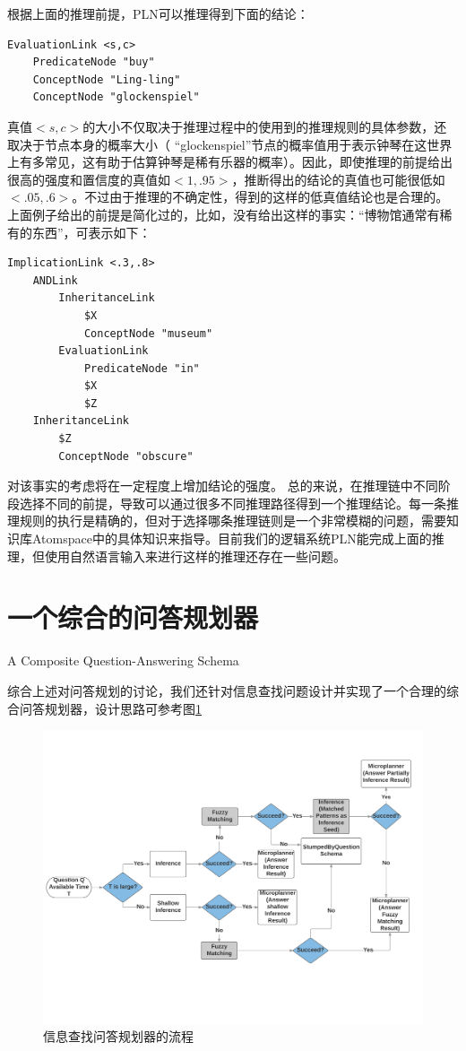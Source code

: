根据上面的推理前提，PLN可以推理得到下面的结论：

\begin{verbatim}
EvaluationLink <s,c>
	PredicateNode "buy"
	ConceptNode "Ling-ling"
	ConceptNode "glockenspiel"
\end{verbatim}

真值$<s,c>$的大小不仅取决于推理过程中的使用到的推理规则的具体参数，还取决于节点本身的概率大小（ “glockenspiel”节点的概率值用于表示钟琴在这世界上有多常见，这有助于估算钟琴是稀有乐器的概率）。因此，即使推理的前提给出很高的强度和置信度的真值如$<1,.95>$，推断得出的结论的真值也可能很低如$<.05,.6>$。不过由于推理的不确定性，得到的这样的低真值结论也是合理的。
上面例子给出的前提是简化过的，比如，没有给出这样的事实：“博物馆通常有稀有的东西”，可表示如下：

\begin{verbatim}
ImplicationLink <.3,.8>
	ANDLink
		InheritanceLink
			$X
			ConceptNode "museum"
		EvaluationLink
			PredicateNode "in"
			$X
			$Z
	InheritanceLink
		$Z
		ConceptNode "obscure"
\end{verbatim}

对该事实的考虑将在一定程度上增加结论的强度。
总的来说，在推理链中不同阶段选择不同的前提，导致可以通过很多不同推理路径得到一个推理结论。每一条推理规则的执行是精确的，但对于选择哪条推理链则是一个非常模糊的问题，需要知识库Atomspace中的具体知识来指导。目前我们的逻辑系统PLN能完成上面的推理，但使用自然语言输入来进行这样的推理还存在一些问题。


\section{一个综合的问答规划器}{A Composite Question-Answering Schema}

综合上述对问答规划的讨论，我们还针对信息查找问题设计并实现了一个合理的综合问答规划器，设计思路可参考图\ref{fig:QA-schema}

\begin{figure}[htb]
\centering
\includegraphics[width=12cm]{figures/QA-schema.png}
\caption{信息查找问答规划器的流程 }
\label{fig:QA-schema}
\end{figure}

